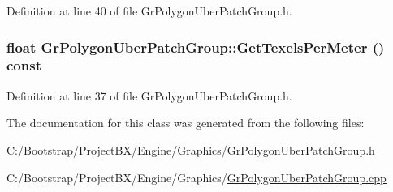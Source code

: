 Definition at line 40 of file GrPolygonUberPatchGroup.h.\hypertarget{class_gr_polygon_uber_patch_group_9813a5a9b335e1ba7f9fe83ad1be84e4}{
\subsubsection[{GetTexelsPerMeter}]{\setlength{\rightskip}{0pt plus 5cm}float GrPolygonUberPatchGroup::GetTexelsPerMeter () const}}
\label{class_gr_polygon_uber_patch_group_9813a5a9b335e1ba7f9fe83ad1be84e4}




Definition at line 37 of file GrPolygonUberPatchGroup.h.

The documentation for this class was generated from the following files:\begin{CompactItemize}
\item 
C:/Bootstrap/ProjectBX/Engine/Graphics/\hyperlink{_gr_polygon_uber_patch_group_8h}{GrPolygonUberPatchGroup.h}\item 
C:/Bootstrap/ProjectBX/Engine/Graphics/\hyperlink{_gr_polygon_uber_patch_group_8cpp}{GrPolygonUberPatchGroup.cpp}\end{CompactItemize}
